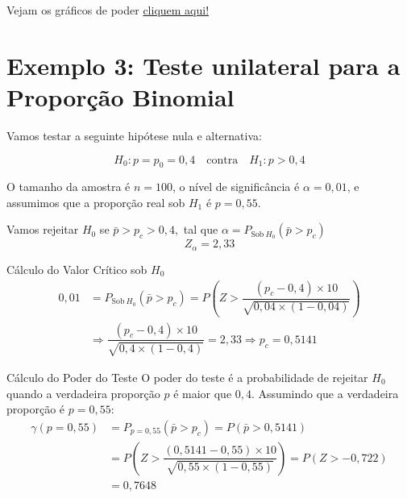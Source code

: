 \documentclass[12pt]{beamer}
\begin{document}
\begin{frame}{}
	\begin{block}{}
		Vejam os gráficos de poder \href{https://est711.shinyapps.io/FuncaoPoder/}{cliquem aqui!}
	\end{block}
\end{frame}

\section{Exemplo 3: Teste unilateral para a Proporção Binomial}
\begin{frame}{}
\begin{block}{}
\justifying
Vamos testar a seguinte hipótese nula e alternativa:

\[
H_0: p = p_0 = 0,4 \quad \text{contra} \quad H_1: p > 0,4
\]

O tamanho da amostra é \(n = 100\), o nível de significância é \(\alpha = 0,01\), e assumimos que a proporção real sob \(H_1\) é \(p = 0,55\).
\end{block}
\pause
\begin{block}{}
	\justifying
	Vamos rejeitar $H_0$ se $\bar{p}>p_{c}>0,4,$ tal que $\alpha=P_{\text{Sob}~H_{0}}(\bar{p}>p_{c})$
	\[
	Z_{\alpha} = 2,33
	\]	
\end{block}
\end{frame}

\begin{frame}{}
	\begin{block}{Cálculo do Valor Crítico sob $H_{0}$}
		\justifying
		\begin{align*}
			0,01&=P_{\text{Sob}~H_{0}}(\bar{p}>p_{c})=P(Z>\dfrac{(p_{c}-0,4)\times10}{\sqrt{0,04\times(1-0,04)}})\\
			&\Rightarrow \dfrac{(p_{c}-0,4)\times10}{\sqrt{0,4\times(1-0,4)}}=2,33\Rightarrow p_{c}=0,5141
		\end{align*}
	\end{block}
	\pause
	\begin{block}{Cálculo do Poder do Teste}
		\justifying
		O poder do teste é a probabilidade de rejeitar $H_0$ quando a verdadeira proporção $p$ é maior que $0,4$. Assumindo que a verdadeira proporção é $p=0,55:$
		\begin{align*}
			\gamma(p=0,55)&=P_{p=0,55}(\bar{p}>p_{c})=P(\bar{p}>0,5141)\\
			&=P(Z>\dfrac{(0,5141-0,55)\times10}{\sqrt{0,55\times(1-0,55)}})=P(Z>-0,722)\\
			&=0,7648
		\end{align*}
	\end{block}
\end{frame}
\end{document}
